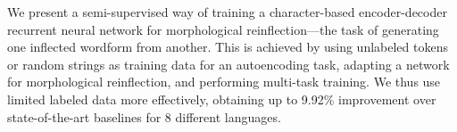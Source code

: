 We present a semi-supervised way of training a character-based encoder-decoder recurrent neural network for morphological reinflection---the task of generating one inflected wordform from another. This is achieved by using unlabeled tokens or random strings as training data for an autoencoding task, adapting a network for morphological reinflection, and performing multi-task training. We thus use limited labeled data more effectively, obtaining up to 9.92\% improvement over state-of-the-art baselines for 8 different languages.
